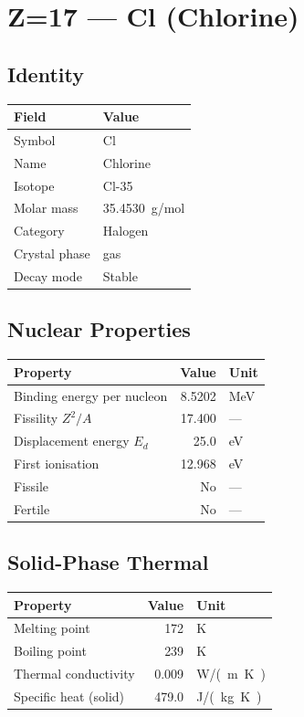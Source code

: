 \documentclass[11pt,a4paper]{article}
\begin{document}
\newpage

\section{Z=17 --- Cl (Chlorine)}
\label{sec:Z17}

\subsection{Identity}
\begin{tabular}{ll}
  \toprule
  Field & Value \\
  \midrule
  Symbol & Cl \\
  Name & Chlorine \\
  Isotope & Cl-35 \\
  Molar mass & \SI{35.4530}{g/mol} \\
  Category & Halogen \\
  Crystal phase & gas \\
  Decay mode & Stable \\
  \bottomrule
\end{tabular}

\subsection{Nuclear Properties}
\begin{tabular}{lrl}
  \toprule
  Property & Value & Unit \\
  \midrule
  Binding energy per nucleon & 8.5202 & \si{MeV} \\
  Fissility $Z^2/A$ & 17.400 & --- \\
  Displacement energy $E_d$ & 25.0 & \si{eV} \\
  First ionisation & 12.968 & \si{eV} \\
  Fissile & No & --- \\
  Fertile & No & --- \\
  \bottomrule
\end{tabular}

\subsection{Solid-Phase Thermal}
\begin{tabular}{lrl}
  \toprule
  Property & Value & Unit \\
  \midrule
  Melting point & 172 & \si{K} \\
  Boiling point & 239 & \si{K} \\
  Thermal conductivity & 0.009 & \si{W/(m.K)} \\
  Specific heat (solid) & 479.0 & \si{J/(kg.K)} \\
  \bottomrule
\end{tabular}
\end{document}
